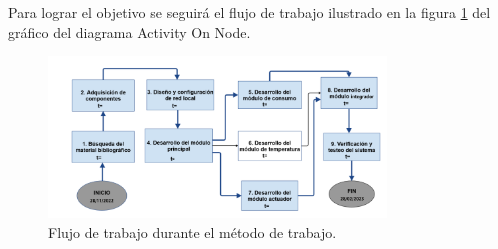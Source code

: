 \documentclass[a4paper, 12pt]{article}
\begin{document}
Para lograr el objetivo se seguirá el flujo de trabajo ilustrado en la figura \ref{fig:diagrama} del gráfico del diagrama Activity On Node.

\begin{figure}[ht]
\begin{center}
\includegraphics[width=0.8\textwidth]{AoN}
\end{center}
\begin{center}
\vskip -0.5cm
\caption{\small{Flujo de trabajo durante el método de trabajo.}}
\label{fig:diagrama}
\end{center}
\end{figure}
\end{document}
